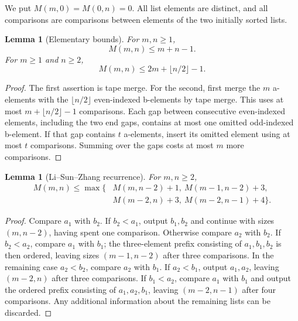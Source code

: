 \documentclass[11pt]{article}
\newtheorem{lemma}[theorem]{Lemma}
\theoremstyle{definition}
\theoremstyle{remark}
\begin{document}
We put $M(m,0)=M(0,n)=0$.  All list elements are distinct, and all comparisons
are comparisons between elements of the two initially sorted lists.

\begin{lemma}[Elementary bounds]\label{lem:upper-elementary}
For $m,n\ge1$,
\[
 M(m,n)\le m+n-1.
\]
For $m\ge1$ and $n\ge2$,
\begin{equation}\label{eq:upper-pair-bound}
 M(m,n)\le 2m+\lfloor n/2\rfloor-1.
\end{equation}
\end{lemma}
\begin{proof}
The first assertion is tape merge.  For the second, first merge the $m$
a-elements with the $\lfloor n/2\rfloor$ even-indexed b-elements
by tape merge.  This uses at most $m+\lfloor n/2\rfloor-1$ comparisons.
Each gap between consecutive even-indexed elements, including the two end
gaps, contains at most one omitted odd-indexed b-element.  If that gap
contains $t$ a-elements, insert its omitted element using at most $t$
comparisons.  Summing over the gaps costs at most $m$ more comparisons.
\end{proof}

\begin{lemma}[Li--Sun--Zhang recurrence]\label{lem:upper-lsz-recurrence}
For $m,n\ge2$,
\begin{equation}\label{eq:upper-lsz-recurrence}
\begin{split}
 M(m,n)\le\max\{&M(m,n-2)+1,\ M(m-1,n-2)+3,\\
                 &M(m-2,n)+3,\ M(m-2,n-1)+4\}.
\end{split}
\end{equation}
\end{lemma}
\begin{proof}
Compare $a_1$ with $b_2$.  If $b_2<a_1$, output $b_1,b_2$ and continue with
sizes $(m,n-2)$, having spent one comparison.
Otherwise compare $a_2$ with $b_2$.  If $b_2<a_2$, compare $a_1$ with $b_1$;
the three-element prefix consisting of $a_1,b_1,b_2$ is then ordered, leaving
sizes $(m-1,n-2)$ after three comparisons.
In the remaining case $a_2<b_2$, compare $a_2$ with $b_1$.  If $a_2<b_1$,
output $a_1,a_2$, leaving $(m-2,n)$ after three comparisons.  If $b_1<a_2$,
compare $a_1$ with $b_1$ and output the ordered prefix consisting of
$a_1,a_2,b_1$, leaving $(m-2,n-1)$ after four comparisons.
Any additional information about the remaining lists can be discarded.
\end{proof}
\end{document}
